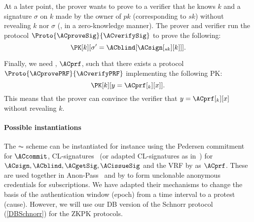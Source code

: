 At a later point, the prover wants to prove to a verifier that he knows \(k\) and a signature \(\sigma\) on \(k\) made by the owner of \(pk\) (corresponding to \(sk\)) without revealing \(k\) nor \(\sigma\) (\ie, in a zero-knowledge manner).
The prover and verifier run the protocol \(\Proto{\ACproveSig}{\ACverifySig}\) to prove the following:
\begin{equation*}
  \PK[k][\sigma' = \ACblind[\ACsign[_{sk}][k]]].
\end{equation*}

Finally, we need , \(\ACprf\), such that there exists a protocol \(\Proto{\ACprovePRF}{\ACverifyPRF}\) implementing the following \ac{PK}:
\begin{equation*}
  \PK[k][y = \ACprf[_k][x]].
\end{equation*}
This means that the prover can convince the verifier that \(y = \ACprf[_k][x]\) without revealing \(k\).

\paragraph*{Possible instantiations}
The \(\AC\) scheme can be instantiated for instance using the Pedersen commitment~\cite{PedersenCommitment} for \(\ACcommit\), CL-signatures~\cite{CLsignatures} (or adapted CL-signatures as in~\cite{AnonPass}) for \(\ACsign, \ACblind, \ACgetSig, \ACissueSig\) and the \ac{VRF} by \citet{DY-VRF} as \(\ACprf\).
These are used together in Anon-Pass~\cite{AnonPass} and by \textcite{HowToWinTheCloneWars} to form unclonable anonymous credentials for subscriptions.
We have adapted their mechanisms to change the basis of the authentication window (\ie epoch) from a time interval to a protest (\ie cause).
However, we will use our \ac{DB} version of the Schnorr protocol (\cref{DBSchnorr}) for the \ac{ZKPK} protocols.
